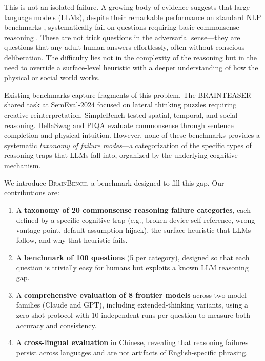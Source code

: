 \documentclass[11pt]{article}
\newcommand{\bench}{\textsc{BrainBench}}
\begin{document}
This is not an isolated failure. A growing body of evidence suggests that large language models (LLMs), despite their remarkable performance on standard NLP benchmarks \citep{wang2019superglue, srivastava2023beyond}, systematically fail on questions requiring basic commonsense reasoning \citep{davis2015commonsense, marcus2020next}. These are not trick questions in the adversarial sense---they are questions that any adult human answers effortlessly, often without conscious deliberation. The difficulty lies not in the complexity of the reasoning but in the need to override a surface-level heuristic with a deeper understanding of how the physical or social world works.

Existing benchmarks capture fragments of this problem. The BRAINTEASER shared task at SemEval-2024 \citep{jiang2024brainteaser} focused on lateral thinking puzzles requiring creative reinterpretation. SimpleBench \citep{simplebench2024} tested spatial, temporal, and social reasoning. HellaSwag \citep{zellers2019hellaswag} and PIQA \citep{bisk2020piqa} evaluate commonsense through sentence completion and physical intuition. However, none of these benchmarks provides a systematic \emph{taxonomy of failure modes}---a categorization of the specific types of reasoning traps that LLMs fall into, organized by the underlying cognitive mechanism.

We introduce \bench{}, a benchmark designed to fill this gap. Our contributions are:

\begin{enumerate}[leftmargin=*, itemsep=2pt]
  \item A \textbf{taxonomy of 20 commonsense reasoning failure categories}, each defined by a specific cognitive trap (e.g., broken-device self-reference, wrong vantage point, default assumption hijack), the surface heuristic that LLMs follow, and why that heuristic fails.
  \item A \textbf{benchmark of 100 questions} (5 per category), designed so that each question is trivially easy for humans but exploits a known LLM reasoning gap.
  \item A \textbf{comprehensive evaluation of 8 frontier models} across two model families (Claude and GPT), including extended-thinking variants, using a zero-shot protocol with 10 independent runs per question to measure both accuracy and consistency.
  \item A \textbf{cross-lingual evaluation} in Chinese, revealing that reasoning failures persist across languages and are not artifacts of English-specific phrasing.
\end{enumerate}
\end{document}
